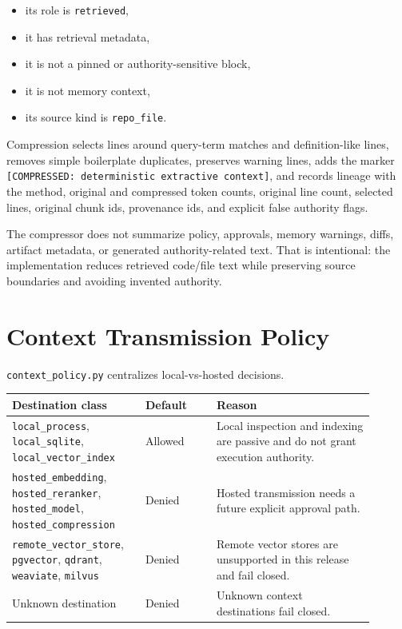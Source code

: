 \documentclass[11pt]{article}
\begin{document}
\begin{itemize}[leftmargin=*]
  \item its role is \texttt{retrieved},
  \item it has retrieval metadata,
  \item it is not a pinned or authority-sensitive block,
  \item it is not memory context,
  \item its source kind is \texttt{repo\_file}.
\end{itemize}

Compression selects lines around query-term matches and definition-like lines, removes simple boilerplate duplicates, preserves warning lines, adds the marker \texttt{[COMPRESSED: deterministic extractive context]}, and records lineage with the method, original and compressed token counts, original line count, selected lines, original chunk ids, provenance ids, and explicit false authority flags.

The compressor does not summarize policy, approvals, memory warnings, diffs, artifact metadata, or generated authority-related text. That is intentional: the implementation reduces retrieved code/file text while preserving source boundaries and avoiding invented authority.

\section{Context Transmission Policy}

\texttt{context\_policy.py} centralizes local-vs-hosted decisions.

\begin{longtable}{p{0.32\linewidth}p{0.18\linewidth}p{0.40\linewidth}}
\toprule
\textbf{Destination class} & \textbf{Default} & \textbf{Reason} \\
\midrule
\texttt{local\_process}, \texttt{local\_sqlite}, \texttt{local\_vector\_index} & Allowed & Local inspection and indexing are passive and do not grant execution authority. \\
\texttt{hosted\_embedding}, \texttt{hosted\_reranker}, \texttt{hosted\_model}, \texttt{hosted\_compression} & Denied & Hosted transmission needs a future explicit approval path. \\
\texttt{remote\_vector\_store}, \texttt{pgvector}, \texttt{qdrant}, \texttt{weaviate}, \texttt{milvus} & Denied & Remote vector stores are unsupported in this release and fail closed. \\
Unknown destination & Denied & Unknown context destinations fail closed. \\
\bottomrule
\end{longtable}
\end{document}
